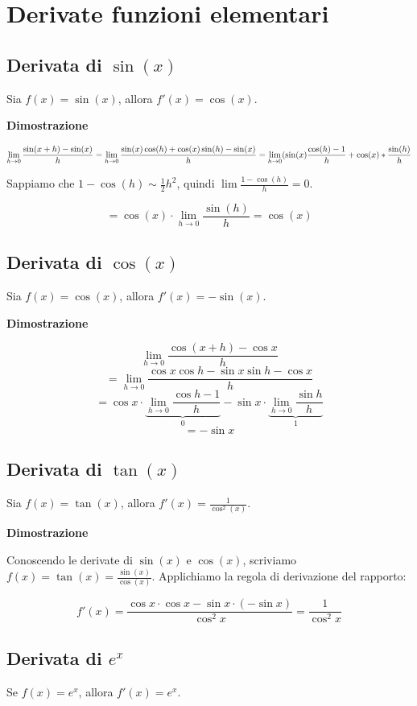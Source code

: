 \section{Derivate funzioni elementari}

\subsection{Derivata di $\sin(x)$}
Sia $f(x) = \sin(x)$, allora $f'(x) = \cos(x)$.

\textbf{Dimostrazione}

$$\lim_{h\to 0} \frac{\sin(x+h)-\sin(x)}{h} \\
=\lim_{h\to 0} \frac{\sin(x)\cos(h)+\cos(x)\sin(h)-\sin(x)}{h} \\
=\lim_{h\to 0} (\sin(x)\frac{\cos(h)-1}{h} + \cos(x)*\frac{\sin(h)}{h}$$

Sappiamo che $1 - \cos(h) \sim \frac{1}{2} h^2$, quindi $\lim \frac{1-\cos(h)}{h} = 0$.

$$= \cos(x) \cdot \lim_{h \to 0} \frac{\sin(h)}{h} = \cos(x)$$

\subsection{Derivata di $\cos(x)$}
Sia $f(x) = \cos(x)$, allora $f'(x) = -\sin(x)$.

\textbf{Dimostrazione}

$$\lim_{h \to 0} \frac{\cos (x+h) - \cos x}{h} $$ $$
=  \lim_{h \to 0} \frac{\cos x \cos h - \sin x \sin h - \cos x}{h} $$ $$
=  \cos x \cdot \underbrace{\lim_{h \to 0} \frac{\cos h - 1}{h}}_{0} - \sin x \cdot \underbrace{\lim_{h \to 0} \frac{\sin h}{h}}_{1} $$ $$
=  - \sin x$$

\subsection{Derivata di $\tan(x)$}

Sia $f(x) = \tan(x)$, allora $f'(x) = \frac{1}{\cos^2(x)}$.

\textbf{Dimostrazione}

Conoscendo le derivate di $\sin(x)$ e $\cos(x)$, scriviamo $f(x) = \tan(x) = \frac{\sin(x)}{\cos(x)}$. Applichiamo la regola di derivazione del rapporto:

$$f'(x) = \frac{\cos x \cdot \cos x - \sin x \cdot (-\sin x)}{\cos^2 x} = \frac{1}{\cos^2x}$$

\subsection{Derivata di $e^x$}
Se $f(x) = e^x$, allora $f'(x) = e^x$.

